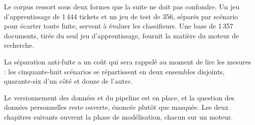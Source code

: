 Le corpus ressort sous deux formes que la suite ne doit pas confondre. Un jeu d'apprentissage de
1\,444 tickets et un jeu de test de 356, séparés par scénario pour écarter toute fuite, servent à
évaluer les classifieurs. Une base de 1\,357 documents, tirée du seul jeu d'apprentissage, fournit
la matière du moteur de recherche.

La séparation anti-fuite a un coût qui sera rappelé au moment de lire les mesures : les
cinquante-huit scénarios se répartissent en deux ensembles disjoints, quarante-six d'un côté et
douze de l'autre.

Le versionnement des données et du pipeline est en place, et la question des données personnelles
reste ouverte, énoncée plutôt que masquée. Les deux chapitres suivants ouvrent la phase de
modélisation, chacun sur un moteur.

